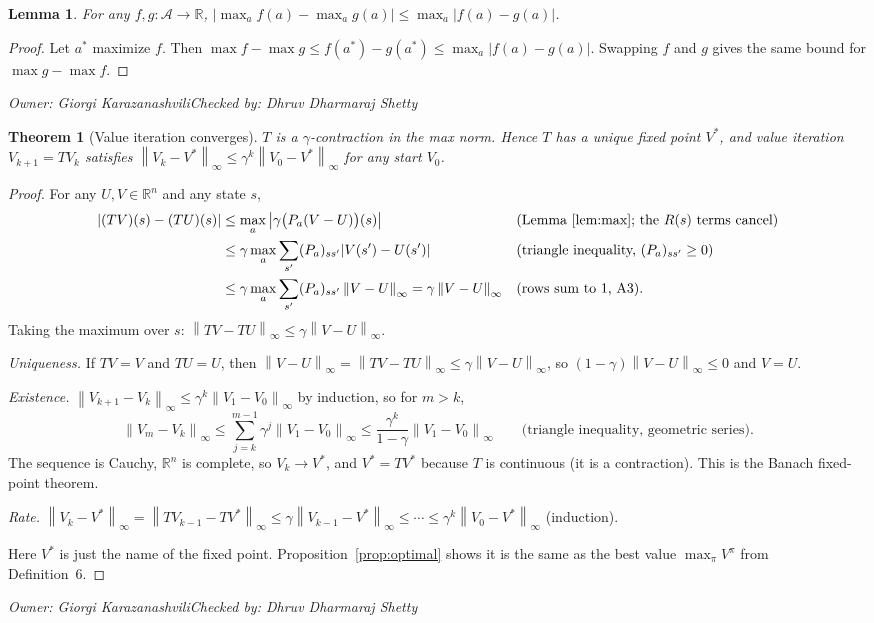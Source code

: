 \documentclass[10pt]{article}
\newtheorem{theorem}{Theorem}
\newtheorem{lemma}{Lemma}
\theoremstyle{definition}
\newcommand{\GK}{Giorgi Karazanashvili}
\newcommand{\DS}{Dhruv Dharmaraj Shetty}
\newcommand{\signoff}[2]{\par\smallskip\hfill\emph{Owner: #1}\qquad\emph{Checked by: #2}\par\medskip}
\newcommand{\R}{\mathbb{R}}
\newcommand{\norm}[1]{\left\lVert #1\right\rVert_\infty}
\newcommand{\Aset}{\mathcal{A}}
\begin{document}
\begin{lemma}\label{lem:max}
For any $f,g:\Aset\to\R$, $|\max_af(a) - \max_ag(a)|\le\max_a|f(a)-g(a)|$.
\end{lemma}
\begin{proof}
Let $a^*$ maximize $f$. Then $\max f - \max g\le f(a^*) - g(a^*)\le\max_a|f(a)-g(a)|$. Swapping $f$ and $g$ gives the same bound for $\max g - \max f$.
\end{proof}
\signoff{\GK}{\DS}

\begin{theorem}[Value iteration converges]\label{thm:contraction}
$T$ is a $\gamma$-contraction in the max norm. Hence $T$ has a unique fixed point $V^*$, and value iteration $V_{k+1} = TV_k$ satisfies $\norm{V_k - V^*}\le\gamma^k\norm{V_0 - V^*}$ for any start $V_0$.
\end{theorem}
\begin{proof}
For any $U,V\in\R^n$ and any state $s$,
\begin{align*}
|(TV)(s) - (TU)(s)| &\le \max_a\big|\gamma\big(P_a(V-U)\big)(s)\big| && \text{(Lemma~\ref{lem:max}; the $R(s)$ terms cancel)}\\
&\le \gamma\max_a\sum_{s'}(P_a)_{ss'}|V(s')-U(s')| && \text{(triangle inequality, $(P_a)_{ss'}\ge0$)}\\
&\le \gamma\max_a\sum_{s'}(P_a)_{ss'}\norm{V-U} = \gamma\norm{V-U} && \text{(rows sum to 1, A3).}
\end{align*}
Taking the maximum over $s$: $\norm{TV-TU}\le\gamma\norm{V-U}$.

\emph{Uniqueness.} If $TV = V$ and $TU = U$, then $\norm{V-U} = \norm{TV-TU}\le\gamma\norm{V-U}$, so $(1-\gamma)\norm{V-U}\le0$ and $V = U$.

\emph{Existence.} $\norm{V_{k+1}-V_k}\le\gamma^k\norm{V_1-V_0}$ by induction, so for $m>k$,
\[
\norm{V_m-V_k}\le\sum_{j=k}^{m-1}\gamma^j\norm{V_1-V_0}\le\frac{\gamma^k}{1-\gamma}\norm{V_1-V_0} \qquad\text{(triangle inequality, geometric series).}
\] The sequence is Cauchy, $\R^n$ is complete, so $V_k\to V^*$, and $V^* = TV^*$ because $T$ is continuous (it is a contraction). This is the Banach fixed-point theorem.

\emph{Rate.} $\norm{V_k-V^*} = \norm{TV_{k-1}-TV^*}\le\gamma\norm{V_{k-1}-V^*}\le\cdots\le\gamma^k\norm{V_0-V^*}$ (induction).

Here $V^*$ is just the name of the fixed point. Proposition~\ref{prop:optimal} shows it is the same as the best value $\max_\pi V^\pi$ from Definition~6.
\end{proof}
\signoff{\GK}{\DS}
\end{document}

